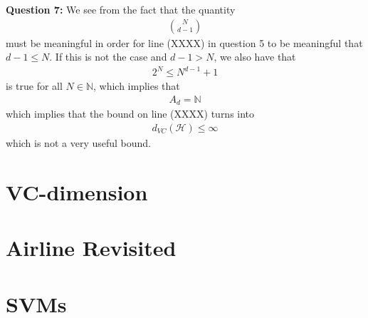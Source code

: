 \documentclass[12pt]{article}
\begin{document}
\textbf{Question 7:} We see from the fact that the quantity
\begin{align}
\binom{N}{d-1}
\end{align}
must be meaningful in order for line (XXXX) in question 5 to be meaningful that $d-1\leq N$. If this is not the case and $d-1>N$, we also have that
\begin{align}
2^N \leq N^{d-1} + 1
\end{align}
is true for all $N \in \mathbb{N}$, which implies that
\begin{align}
A_d = \mathbb{N}
\end{align}
which implies that the bound on line (XXXX) turns into
\begin{align}
d_{VC}(\mathcal{H}) \leq \infty
\end{align}
which is not a very useful bound.

\section{VC-dimension}



\section{Airline Revisited}



\section{SVMs}


\end{document}
